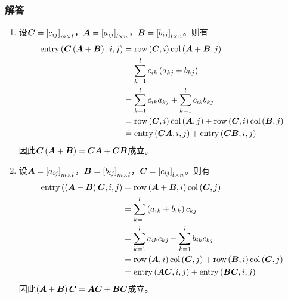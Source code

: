 \documentclass{beamer}
\begin{document}
\begin{frame}[allowframebreaks]
\frametitle{解答}

    \begin{enumerate}
        \item
              {
              设\(\boldsymbol{C}=\left[ c_{ij} \right]_{m\times l}\)，\(\boldsymbol{A}=\left[ a_{ij} \right]_{l\times n}\)，\(\boldsymbol{B}=\left[ b_{ij} \right]_{l\times n}\)。则有
              \begin{align*}
                  \mathrm{entry}\left( \boldsymbol{C}\left( \boldsymbol{A}+\boldsymbol{B} \right),i,j \right) & =\mathrm{row}\left( \boldsymbol{C},i \right)\mathrm{col}\left( \boldsymbol{A}+\boldsymbol{B},j \right)                        \\
                                                         & =\sum_{k=1}^lc_{ik}\left( a_{kj}+b_{kj} \right)                   \\
                                                         & =\sum_{k=1}^lc_{ik}a_{kj}+\sum_{k=1}^lc_{ik}b_{kj}         \\
                                                         & =\mathrm{row}\left( \boldsymbol{C},i \right)\mathrm{col}\left( \boldsymbol{A},j \right)+\mathrm{row}\left( \boldsymbol{C},i \right)\mathrm{col}\left( \boldsymbol{B},j \right) \\
                                                         & =\mathrm{entry}\left( \boldsymbol{C}\boldsymbol{A},i,j \right)+\mathrm{entry}\left( \boldsymbol{C}\boldsymbol{B},i,j \right)
              \end{align*}
              因此\(\boldsymbol{C}\left( \boldsymbol{A}+\boldsymbol{B} \right)=\boldsymbol{C}\boldsymbol{A}+\boldsymbol{C}\boldsymbol{B}\)成立。
              }

        \item
              {
              设\(\boldsymbol{A}=\left[ a_{ij} \right]_{m\times l}\)，\(\boldsymbol{B}=\left[ b_{ij} \right]_{m\times l}\)，\(\boldsymbol{C}=\left[ c_{ij} \right]_{l\times n}\)。则有
              \begin{align*}
                  \mathrm{entry}\left( \left( \boldsymbol{A}+\boldsymbol{B} \right)\boldsymbol{C},i,j \right) & =\mathrm{row}\left( \boldsymbol{A}+\boldsymbol{B},i \right)\mathrm{col}\left( \boldsymbol{C},j \right)                        \\
                                                         & =\sum_{k=1}^l\left( a_{ik}+b_{ik} \right)c_{kj}                   \\
                                                         & =\sum_{k=1}^la_{ik}c_{kj}+\sum_{k=1}^lb_{ik}c_{kj}         \\
                                                         & =\mathrm{row}\left( \boldsymbol{A},i \right)\mathrm{col}\left( \boldsymbol{C},j \right)+\mathrm{row}\left( \boldsymbol{B},i \right)\mathrm{col}\left( \boldsymbol{C},j \right) \\
                                                         & =\mathrm{entry}\left( \boldsymbol{A}\boldsymbol{C},i,j \right)+\mathrm{entry}\left( \boldsymbol{B}\boldsymbol{C},i,j \right)
              \end{align*}
              因此\(\left( \boldsymbol{A}+\boldsymbol{B} \right)\boldsymbol{C}=\boldsymbol{A}\boldsymbol{C}+\boldsymbol{B}\boldsymbol{C}\)成立。
              }


\end{enumerate}
\end{frame}
\end{document}
